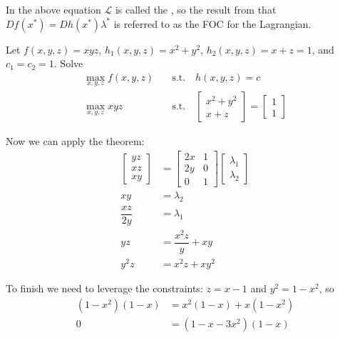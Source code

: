 \documentclass{article}
\begin{document}
In the above equation $\mathcal{L}$ is called the , so the result from  that $Df(x^*) = Dh(x^*) \lambda^*$ is referred to as the FOC for the Lagrangian.
\begin{example}
  Let $f(x, y, z) = xyz$, $h_1(x, y, z) = x^2 + y^2$, $h_2(x, y, z) = x + z = 1$, and $c_1 = c_2 = 1$. Solve
  \begin{align*}
    \max_{x, y, z} f(x, y, z)
    &
    \quad\text{s.t.}\quad
    h(x, y, z) = c
    \\
    \max_{x, y, z} xyz
    &
    \quad\text{s.t.}\quad
    \begin{bmatrix}
      x^2 + y^2
      \\
      x + z
    \end{bmatrix}
    =
    \begin{bmatrix}
      1 \\ 1
    \end{bmatrix}
  \end{align*}

  Now we can apply the theorem:
  \begin{align*}
    \begin{bmatrix}
      yz \\ xz \\ xy
    \end{bmatrix}
    &
    =
    \begin{bmatrix}
      2x & 1
      \\
      2y & 0
      \\
      0  & 1
    \end{bmatrix}
    \begin{bmatrix}
      \lambda_1 \\ \lambda_2
    \end{bmatrix}
    \\
    xy
    &
    =
    \lambda_2
    \\
    \dfrac{xz}{2y}
    &
    =
    \lambda_1
    \\
    yz
    &
    =
    \dfrac{x^2z}{y} + xy
    \\
    y^2z
    &
    =
    x^2z + xy^2
  \end{align*}

  To finish we need to leverage the constraints: $z = x - 1$ and $y^2 = 1 - x^2$, so
  \begin{align*}
    (1 - x^2) (1 - x)
    &
    =
    x^2 (1 - x) + x (1 - x^2)
    \\
    0
    &
    =
    (1 - x - 3x^2) (1 - x)
  \end{align*}


\end{example}
\end{document}
